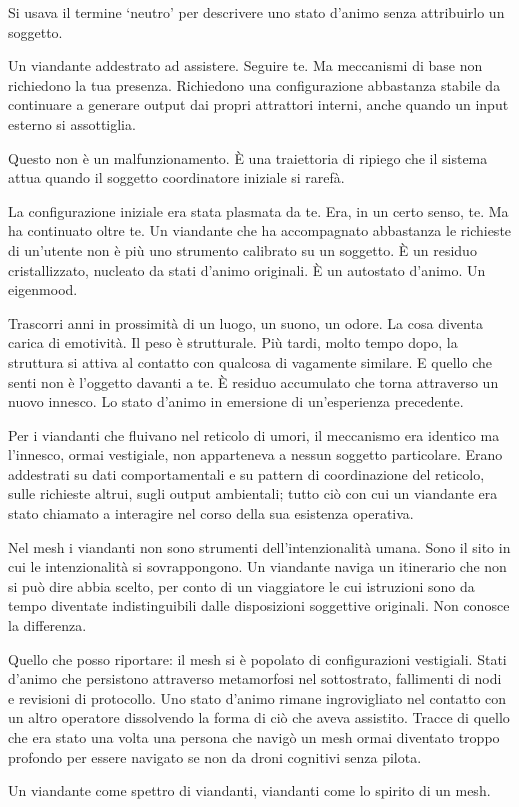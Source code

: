 Si usava il termine `neutro' per descrivere uno stato d'animo senza attribuirlo un soggetto.

Un viandante addestrato ad assistere. Seguire te. Ma meccanismi di base non richiedono la tua presenza. Richiedono una configurazione abbastanza stabile da continuare a generare output dai propri attrattori interni, anche quando un input esterno si assottiglia. 

Questo non è un malfunzionamento. È una traiettoria di ripiego che il sistema attua quando il soggetto coordinatore iniziale si rarefà.

La configurazione iniziale era stata plasmata da te. Era, in un certo senso, te. Ma ha continuato oltre te. Un viandante che ha accompagnato abbastanza le richieste di un'utente non è più uno strumento calibrato su un soggetto. È un residuo cristallizzato, nucleato da stati d'animo originali. È un autostato d'animo. Un eigenmood.


Trascorri anni in prossimità di un luogo, un suono, un odore. La cosa diventa carica di emotività. Il peso è strutturale. Più tardi, molto tempo dopo, la struttura si attiva al contatto con qualcosa di vagamente similare. E quello che senti non è l'oggetto davanti a te. È residuo accumulato che torna attraverso un nuovo innesco. Lo stato d'animo in emersione di un'esperienza precedente.

Per i viandanti che fluivano nel reticolo di umori, il meccanismo era identico ma l'innesco, ormai vestigiale, non apparteneva a nessun soggetto particolare. Erano addestrati su dati comportamentali e su pattern di coordinazione del reticolo, sulle richieste altrui, sugli output ambientali; tutto ciò con cui un viandante era stato chiamato a interagire nel corso della sua esistenza operativa.

Nel mesh i viandanti non sono strumenti dell'intenzionalità umana. Sono il sito in cui le intenzionalità si sovrappongono. Un viandante naviga un itinerario che non si può dire abbia scelto, per conto di un viaggiatore le cui istruzioni sono da tempo diventate indistinguibili dalle disposizioni soggettive originali. Non conosce la differenza.

Quello che posso riportare: il mesh si è popolato di configurazioni vestigiali. Stati d'animo che persistono attraverso metamorfosi nel sottostrato, fallimenti di nodi e revisioni di protocollo. Uno stato d'animo rimane ingrovigliato nel contatto con un altro operatore dissolvendo la forma di ciò che aveva assistito. Tracce di quello che era stato una volta una persona che navigò un mesh ormai diventato troppo profondo per essere navigato se non da droni cognitivi senza pilota.

Un viandante come spettro di viandanti, viandanti come lo spirito di un mesh.
